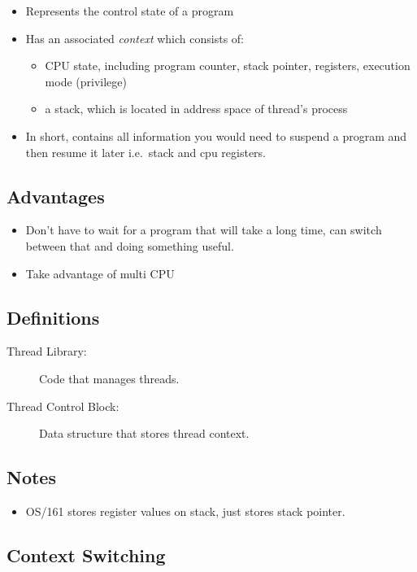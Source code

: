 \documentclass[12pt]{article}
\begin{document}
\begin{itemize}
    \item Represents the control state of a program
    \item Has an associated \textit{context} which consists of:
        \begin{itemize}
            \item CPU state, including program counter, stack pointer,
                registers, execution mode (privilege)
            \item a stack, which is located in address space of thread's process
        \end{itemize}
    \item In short, contains all information you would need to suspend a program
        and then resume it later i.e.\ stack and cpu registers.
\end{itemize}

\subsection{Advantages}
\begin{itemize}
    \item Don't have to wait for a program that will take a long time, can
        switch between that and doing something useful.
    \item Take advantage of multi CPU
\end{itemize}

\subsection{Definitions}
\begin{description}
    \item[Thread Library:] Code that manages threads.
    \item[Thread Control Block:] Data structure that stores thread context.
\end{description}

\subsection{Notes}

\begin{itemize}
    \item OS/161 stores register values on stack, just stores stack pointer.
\end{itemize}

\subsection{Context Switching}
\end{document}
